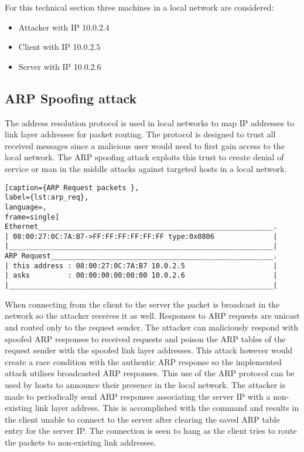 For this technical section three machines in a local network are considered: 
\begin{itemize}
\item Attacker with IP 10.0.2.4
\item Client with IP 10.0.2.5
\item Server with IP 10.0.2.6  
\end{itemize}
\subsection{ARP Spoofing attack}
The address resolution protocol is used in local networks to map IP addresses to link layer addresses for packet routing. The protocol is designed to trust all received messages since a malicious user would need to first gain access to the local network. The ARP spoofing attack exploits this trust to create denial of service or man in the middle attacks against targeted hosts in a local network.
\begin{minipage}{\linewidth}
\begin{lstlisting}[caption={ARP Request packets },
label={lst:arp_req},
language=,
frame=single]
Ethernet________________________________________________________.
| 08:00:27:0C:7A:B7->FF:FF:FF:FF:FF:FF type:0x0806              |
|_______________________________________________________________|
ARP Request_____________________________________________________.
| this address : 08:00:27:0C:7A:B7 10.0.2.5                     |
| asks         : 00:00:00:00:00:00 10.0.2.6                     |
|_______________________________________________________________|
\end{lstlisting}
\end{minipage}
When connecting from the client to the server the packet  is broadcast in the network so the attacker receives it as well. Responses to ARP requests are unicast and routed only to the request sender. The attacker can maliciously respond with spoofed ARP responses to received requests and poison the ARP tables of the request sender with the spoofed link layer addresses. This attack however would create a race condition with the authentic ARP response so the implemented attack utilises broadcasted ARP responses. This use of the ARP protocol can be used by hosts to announce their presence in the local network. 
The attacker is made to periodically send ARP responses  associating the server IP with a non-existing link layer address. This is accomplished with the command  and results in the client unable to connect to the server after clearing the saved ARP table entry for the server IP. The connection is seen to hang  as the client tries to route the packets to non-existing link addresses.
